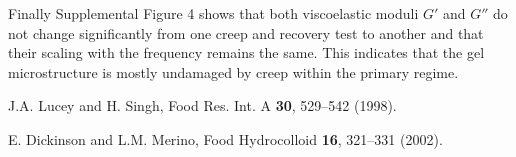 \documentclass[twocolumn,superscriptaddress,showpacs,preprintnumbers,amsmath,amssymb,prl]{revtex4}
\begin{document}
Finally Supplemental Figure 4 shows that both viscoelastic moduli $G'$ and $G''$ do not change significantly from one creep and recovery test to another and that their scaling with the frequency remains the same. This indicates that the gel microstructure is mostly undamaged by creep within the primary regime.

\begin{thebibliography}{}

 J.A. Lucey and H. Singh, Food Res. Int. A {\bf 30}, 529--542 (1998).

 E. Dickinson and L.M. Merino, Food Hydrocolloid {\bf 16}, 321--331 (2002).

\end{thebibliography}
\end{document}
